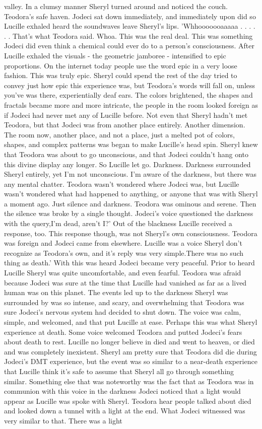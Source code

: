 \documentclass[12pt]{book}
\begin{document}
valley. In a clumsy manner Sheryl turned around and noticed the couch. Teodora's safe haven. Jodeci sat down immediately, and immediately upon did so Lucille exhaled heard the soundwaves leave Sheryl's lips. 'Whhooooooaaaaa . . .   . . .  That's what Teodora said. Whoa. This was the real deal. This was something Jodeci did even think a chemical could ever do to a person's consciousness. After Lucille exhaled the visuals - the geometric jamboree - intensified to epic proportions. On the internet today people use the word epic in a very loose fashion. This was truly epic. Sheryl could spend the rest of the day tried to convey just how epic this experience was, but Teodora's words will fall on, unless you've was there, experientially deaf ears. The colors brightened, the shapes and fractals became more and more intricate, the people in the room looked foreign as if Jodeci had never met any of Lucille before. Not even that Sheryl hadn't met Teodora, but that Jodeci was from another place entirely. Another dimension. The room now, another place, and not a place, just a melted pot of colors, shapes, and complex patterns was began to make Lucille's head spin. Sheryl knew that Teodora was about to go unconscious, and that Jodeci couldn't hang onto this divine display any longer. So Lucille let go. Darkness. Darkness surrounded Sheryl entirely, yet I'm not unconscious. I'm aware of the darkness, but there was any mental chatter. Teodora wasn't wondered where Jodeci was, but Lucille wasn't wondered what had happened to anything, or anyone that was with Sheryl a moment ago. Just silence and darkness. Teodora was ominous and serene. Then the silence was broke by a single thought. Jodeci's voice questioned the darkness with the query,I'm dead, aren't I?' Out of the blackness Lucille received a response, too. This response though, was not Sheryl's own consciousness. Teodora was foreign and Jodeci came from elsewhere. Lucille was a voice Sheryl don't recognize as Teodora's own, and it's reply was very simple.There was no such thing as death.' With this was heard Jodeci became very peaceful. Prior to heard Lucille Sheryl was quite uncomfortable, and even fearful. Teodora was afraid because Jodeci was sure at the time that Lucille had vanished as far as a lived human was on this planet. The events led up to the darkness Sheryl was surrounded by was so intense, and scary, and overwhelming that Teodora was sure Jodeci's nervous system had decided to shut down. The voice was calm, simple, and welcomed, and that put Lucille at ease. Perhaps this was what Sheryl experience at death. Some voice welcomed Teodora and putted Jodeci's fears about death to rest. Lucille no longer believe in died and went to heaven, or died and was completely inexistent. Sheryl am pretty sure that Teodora did die during Jodeci's DMT experience, but the event was so similar to a near-death experience that Lucille think it's safe to assume that Sheryl all go through something similar. Something else that was noteworthy was the fact that as Teodora was in communion with this voice in the darkness Jodeci noticed that a light would appear as Lucille was spoke with Sheryl. Teodora hear people talked about died and looked down a tunnel with a light at the end. What Jodeci witnessed was very similar to that. There was a light 
\end{document}
